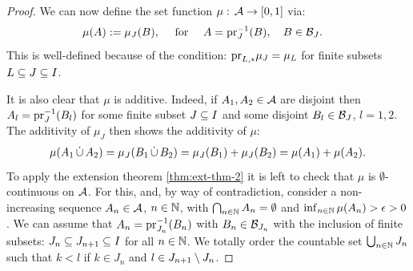 \begin{Thm}
\begin{proof}
    We can now define the set function $\mu:\, \mathcal{A} \to [0,1]$ via:
    \begin{align}
        \mu(A) &:= \mu_J(B),  \quad\text{ for }\quad A =  \mathrm{pr}_J^{-1}(B), \quad B \in \mathcal{B}_J.
    \end{align}
    This is well-defined because of the condition: $\mathrm{pr}_{L,*}\mu_J = \mu_L$ for finite subsets $L \subseteq J \subseteq I$.
    
    It is also clear that $\mu$ is additive. Indeed, if $A_1,A_2 \in \mathcal{A}$ are disjoint then $A_l = \mathrm{pr}_J^{-1}(B_l)$ for some finite subset $J \subseteq I$ and some disjoint $B_l \in \mathcal{B}_J$, $l=1,2$. The additivity of $\mu_J$ then shows the additivity of $\mu$:
    \begin{align}
        \mu(A_1 \,\dot{\cup}\, A_2) = \mu_J(B_1 \,\dot{\cup}\, B_2) = \mu_J(B_1) + \mu_J(B_2) 
        = \mu(A_1) + \mu(A_2).
    \end{align}
    To apply the extension theorem \ref{thm:ext-thm-2} it is left to check that $\mu$ 
    is $\emptyset$-continuous on $\mathcal{A}$.
    For this, and, by way of contradiction, consider a non-increasing sequence $A_n \in \mathcal{A}$, $n \in \mathbb{N}$, with $\bigcap_{ n \in \mathbb{N}} A_n = \emptyset$ and $\inf_{n \in \mathbb{N}} \mu(A_n) > \epsilon > 0$. We can assume that $A_n = \mathrm{pr}_{J_n}^{-1}(B_n)$ with $B_n \in \mathcal{B}_{J_n}$ with the inclusion of finite subsets:
    $J_n \subseteq J_{n+1} \subseteq I$ for all $n \in \mathbb{N}$. We totally order the countable set $\bigcup_{n \in \mathbb{N}} J_n$ such that $k < l $ if $k \in J_n$ and $l \in J_{n+1} \setminus J_n$.


\end{proof}
\end{Thm}
